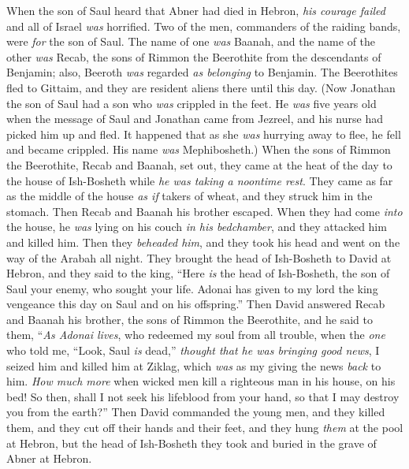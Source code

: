\begin{biblechapter} %
 When the son of Saul heard that Abner had died in Hebron, \textit{his courage failed} and all of Israel \textit{was} horrified.
\verse Two of the men, commanders of the raiding bands, were \textit{for} the son of Saul. The name of one \textit{was} Baanah, and the name of the other \textit{was} Recab, the sons of Rimmon the Beerothite from the descendants of Benjamin; also, Beeroth \textit{was} regarded \textit{as belonging} to Benjamin.
\verse The Beerothites fled to Gittaim, and they are resident aliens there until this day.
\verse (Now Jonathan the son of Saul had a son who \textit{was} crippled in the feet. He \textit{was} five years old when the message of Saul and Jonathan came from Jezreel, and his nurse had picked him up and fled. It happened that as she \textit{was} hurrying away to flee, he fell and became crippled. His name \textit{was} Mephibosheth.)
\verse When the sons of Rimmon the Beerothite, Recab and Baanah, set out, they came at the heat of the day to the house of Ish-Bosheth while \textit{he \textit{was} taking a noontime rest}.
\verse They came as far as the middle of the house \textit{as if} takers of wheat, and they struck him in the stomach. Then Recab and Baanah his brother escaped.
\verse When they had come \textit{into} the house, he \textit{was} lying on his couch \textit{in his bedchamber}, and they attacked him and killed him. Then they \textit{beheaded him}, and they took his head and went on the way of the Arabah all night.
\verse They brought the head of Ish-Bosheth to David at Hebron, and they said to the king, “Here \textit{is} the head of Ish-Bosheth, the son of Saul your enemy, who sought your life. Adonai has given to my lord the king vengeance this day on Saul and on his offspring.”
\verse Then David answered Recab and Baanah his brother, the sons of Rimmon the Beerothite, and he said to them, “\textit{As Adonai lives}, who redeemed my soul from all trouble,
\verse when the \textit{one} who told me, “Look, Saul \textit{is} dead,” \textit{thought that he \textit{was} bringing good news}, I seized him and killed him at Ziklag, which \textit{was} as my giving the news \textit{back} to him.
\verse \textit{How much more} when wicked men kill a righteous man in his house, on his bed! So then, shall I not seek his lifeblood from your hand, so that I may destroy you from the earth?”
\verse Then David commanded the young men, and they killed them, and they cut off their hands and their feet, and they hung \textit{them} at the pool at Hebron, but the head of Ish-Bosheth they took and buried in the grave of Abner at Hebron.
\end{biblechapter}

